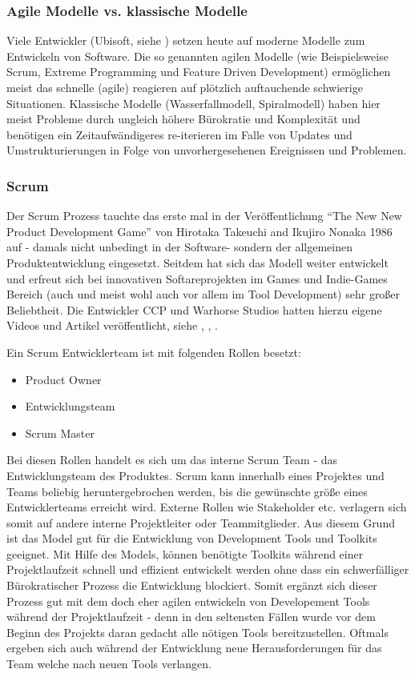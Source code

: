 \documentclass[pagesize, paper=a4, fontsize=12pt,titlepage=true, headings=small, headnosepline, abstractoff, liststotoc, nochapterprefix, plainheadsepline, twoside]{scrreprt}
\begin{document}
\subsubsection{Agile Modelle vs. klassische Modelle}
Viele Entwickler (Ubisoft, siehe \cite{MKG:Schmitz2014}) setzen heute auf moderne Modelle zum Entwickeln von Software. Die so genannten agilen Modelle (wie Beispielsweise Scrum,  Extreme Programming und Feature Driven Development) ermöglichen meist das schnelle (agile) reagieren auf plötzlich auftauchende schwierige Situationen. Klassische Modelle (Wasserfallmodell, Spiralmodell) haben hier meist Probleme durch ungleich höhere Bürokratie und Komplexität und benötigen ein Zeitaufwändigeres re-iterieren im Falle von Updates und Umstrukturierungen in Folge von unvorhergesehenen Ereignissen und Problemen. 
\subsubsection{Scrum}
Der Scrum Prozess tauchte das erste mal in der Veröffentlichung “The New New Product Development Game” von Hirotaka Takeuchi and Ikujiro Nonaka 1986 auf - damals nicht unbedingt in der Software- sondern der allgemeinen Produktentwicklung eingesetzt. Seitdem hat sich das Modell weiter entwickelt und erfreut sich bei innovativen Softareprojekten im Games und Indie-Games Bereich (auch und meist wohl auch vor allem im Tool Development) sehr großer Beliebtheit. Die Entwickler CCP und Warhorse Studios hatten hierzu eigene Videos und Artikel veröffentlicht, siehe \cite{CCP:ScrumAndAgile2009}, \cite{WH:Scrum2013}, \cite{WH:ScrumVideo2013}.

Ein Scrum Entwicklerteam ist mit folgenden Rollen besetzt:
\begin{itemize}
\item Product Owner
\item Entwicklungsteam
\item Scrum Master
\end{itemize}

Bei diesen Rollen handelt es sich um das interne Scrum Team - das Entwicklungsteam des Produktes. Scrum kann innerhalb eines Projektes und Teams beliebig heruntergebrochen werden, bis die gewünschte größe eines Entwicklerteams erreicht wird. Externe Rollen wie Stakeholder etc. verlagern sich somit auf andere interne Projektleiter oder Teammitglieder. Aus diesem Grund ist das Model gut für die Entwicklung von Development Tools und Toolkits geeignet. Mit Hilfe des Models, können benötigte Toolkits während einer Projektlaufzeit schnell und effizient entwickelt werden ohne dass ein schwerfälliger Bürokratischer Prozess die Entwicklung blockiert. Somit ergänzt sich dieser Prozess gut mit dem doch eher agilen entwickeln von Developement Tools während der Projektlaufzeit - denn in den seltensten Fällen wurde vor dem Beginn des Projekts daran gedacht alle nötigen Tools bereitzustellen. Oftmals ergeben sich auch während der Entwicklung neue Herausforderungen für das Team welche nach neuen Tools verlangen.
\end{document}
